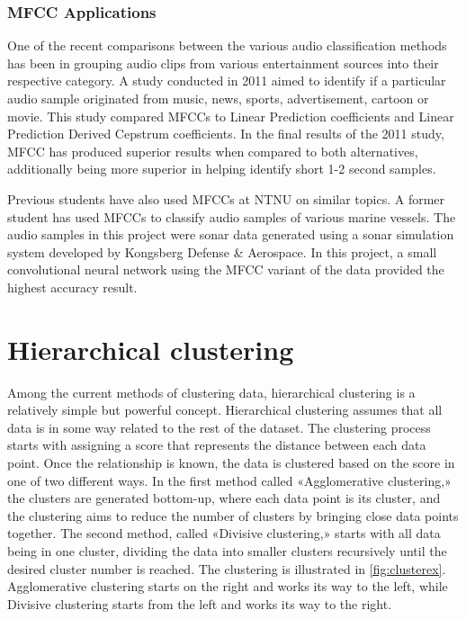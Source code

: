\subsubsection{MFCC Applications}

One of the recent comparisons between the various audio classification methods has been in grouping audio clips from various entertainment sources into their respective category.
A study conducted in 2011\cite{DHANALAKSHMI2011350} aimed to identify if a particular audio sample originated from music, news, sports, advertisement, cartoon or movie.
This study compared MFCCs to Linear Prediction coefficients and Linear Prediction Derived Cepstrum coefficients.
In the final results of the 2011 study, MFCC has produced superior results when compared to both alternatives, additionally being more superior in helping identify short 1-2 second samples.

Previous students have also used MFCCs at NTNU on similar topics. A former student has used MFCCs to classify audio samples of various marine vessels\cite{marine}.
The audio samples in this project were sonar data generated using a sonar simulation system developed by Kongsberg Defense \& Aerospace.
In this project, a small convolutional neural network using the MFCC variant of the data provided the highest accuracy result.


\section{Hierarchical clustering}



Among the current methods of clustering data, hierarchical clustering\cite{wiki:hierarchicalclustering} is a relatively simple but powerful concept. 
Hierarchical clustering assumes that all data is in some way related to the rest of the dataset. 
The clustering process starts with assigning a score that represents the distance between each data point. 
Once the relationship is known, the data is clustered based on the score in one of two different ways. 
In the first method called «Agglomerative clustering,» the clusters are generated bottom-up, where each data point is its cluster, and the clustering aims to reduce the number of clusters by bringing close data points together. 
The second method, called «Divisive clustering,» starts with all data being in one cluster, dividing the data into smaller clusters recursively until the desired cluster number is reached.
The clustering is illustrated in \cref{fig:clusterex}. 
Agglomerative clustering starts on the right and works its way to the left, while Divisive clustering starts from the left and works its way to the right.


